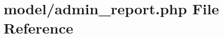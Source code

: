 \hypertarget{admin__report_8php}{}\section{model/admin\+\_\+report.php File Reference}
\label{admin__report_8php}
